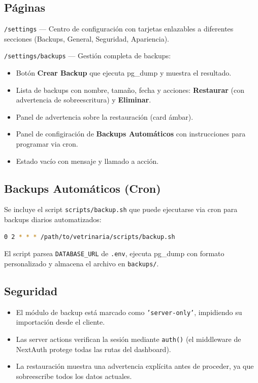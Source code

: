 \documentclass[12pt,a4paper]{article}
\begin{document}
\subsection{Páginas}

\texttt{/settings} — Centro de configuración con tarjetas enlazables a
diferentes secciones (Backups, General, Seguridad, Apariencia).

\texttt{/settings/backups} — Gestión completa de backups:

\begin{itemize}[leftmargin=*]
    \item Botón \textbf{Crear Backup} que ejecuta pg\_dump y muestra el resultado.
    \item Lista de backups con nombre, tamaño, fecha y acciones:
          \textbf{Restaurar} (con advertencia de sobreescritura) y
          \textbf{Eliminar}.
    \item Panel de advertencia sobre la restauración (card ámbar).
    \item Panel de configiración de \textbf{Backups Automáticos} con
          instrucciones para programar via cron.
    \item Estado vacío con mensaje y llamado a acción.
\end{itemize}

\subsection{Backups Automáticos (Cron)}

Se incluye el script \texttt{scripts/backup.sh} que puede ejecutarse
via cron para backups diarios automatizados:

\begin{lstlisting}[language=bash, caption=Programar backup diario a las 2:00 AM]
0 2 * * * /path/to/vetrinaria/scripts/backup.sh
\end{lstlisting}

El script parsea \texttt{DATABASE\_URL} de \texttt{.env}, ejecuta pg\_dump
con formato personalizado y almacena el archivo en \texttt{backups/}.

\subsection{Seguridad}

\begin{itemize}[leftmargin=*]
    \item El módulo de backup está marcado como \texttt{'server-only'},
          impidiendo su importación desde el cliente.
    \item Las server actions verifican la sesión mediante \texttt{auth()}
          (el middleware de NextAuth protege todas las rutas del dashboard).
    \item La restauración muestra una advertencia explícita antes de
          proceder, ya que sobreescribe todos los datos actuales.
\end{itemize}
\end{document}
